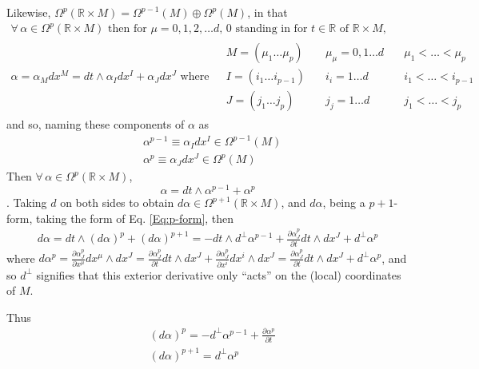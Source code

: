 \documentclass[10pt]{amsart}
\begin{document}
Likewise, $\Omega^p(\mathbb{R} \times M) = \Omega^{p-1}(M) \oplus \Omega^p(M)$, in that 
\[
\begin{gathered}
 \forall \,  \alpha \in \Omega^p(\mathbb{R} \times M) \text{ then for $\mu = 0, 1, 2, \dots d$, $0$ standing in for $t\in \mathbb{R}$ of $\mathbb{R}\times M$, }\\ 
\alpha = \alpha_M dx^M = dt \wedge \alpha_I dx^I + \alpha_J dx^J \text{ where } \begin{aligned} & M = (\mu_1 \dots \mu_p) \quad & \mu_{\mu} = 0,1 \dots d \quad & \mu_1 < \dots < \mu_p \\
  & I = (i_1 \dots i_{p-1}) \quad & i_i = 1 \dots d \quad & i_1 < \dots < i_{p-1} \\
  & J = (j_1 \dots j_{p}) \quad & j_j = 1 \dots d \quad & j_1 < \dots < j_{p} 
\end{aligned} 
\end{gathered}
\]
and so, naming these components of $\alpha$ as 
\[
\begin{aligned}
  & \alpha^{p-1} \equiv \alpha_I dx^I \in \Omega^{p-1}(M) \\ 
  & \alpha^{p} \equiv \alpha_J dx^J \in \Omega^{p}(M) 
\end{aligned}
\]
Then $\forall \, \alpha \in \Omega^p(\mathbb{R} \times M)$, 
\begin{equation}\label{Eq:p-form}
\alpha = dt \wedge \alpha^{p-1} + \alpha^p
\end{equation}.  Taking $d$ on both sides to obtain $d\alpha \in \Omega^{p+1}(\mathbb{R} \times M)$, and $d\alpha$, being a $p+1$-form, taking the form of Eq. \ref{Eq:p-form}, then
\[
\begin{gathered}
  d\alpha = dt \wedge (d\alpha)^p + (d\alpha)^{p+1} = -dt \wedge d^{\perp} \alpha^{p-1} + \frac{ \partial \alpha^p_J}{ \partial t} dt \wedge dx^J + d^{\perp}\alpha^p
\end{gathered}
\]
where $d\alpha^p = \frac{ \partial \alpha^p_J}{ \partial x^{\mu }} dx^{\mu} \wedge dx^J = \frac{ \partial \alpha^p_J}{\partial t} dt \wedge dx^J + \frac{ \partial \alpha_J^p}{ \partial x^i} dx^i \wedge dx^J = \frac{ \partial \alpha_J^p }{ \partial t} dt \wedge dx^J + d^{\perp}\alpha^p$, and so $d^{\perp}$ signifies that this exterior derivative only ``acts'' on the (local) coordinates of $M$.  

Thus
\[
\begin{aligned}
  & (d\alpha)^p = -d^{\perp} \alpha^{p-1}  + \frac{ \partial \alpha^p }{ \partial t} \\ 
  &  (d\alpha)^{p+1} = d^{\perp}\alpha^p
\end{aligned}
\]
\end{document}
